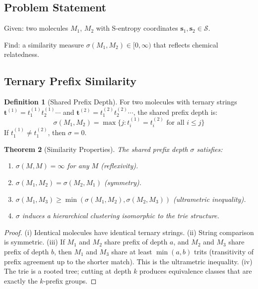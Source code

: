 \documentclass[11pt,twocolumn,a4paper]{article}
\newtheorem{theorem}{Theorem}[section]
\theoremstyle{definition}
\newtheorem{definition}[theorem]{Definition}
\theoremstyle{remark}
\newcommand{\Sspace}{\mathcal{S}}
\begin{document}
\subsection{Problem Statement}

Given: two molecules $M_1$, $M_2$ with S-entropy coordinates $\mathbf{s}_1, \mathbf{s}_2 \in \Sspace$.

Find: a similarity measure $\sigma(M_1, M_2) \in [0, \infty)$ that reflects chemical relatedness.

\subsection{Ternary Prefix Similarity}

\begin{definition}[Shared Prefix Depth]
\label{def:spd}
For two molecules with ternary strings $\mathbf{t}^{(1)} = t_1^{(1)} t_2^{(1)} \cdots$ and $\mathbf{t}^{(2)} = t_1^{(2)} t_2^{(2)} \cdots$, the shared prefix depth is:
\begin{equation}
\sigma(M_1, M_2) = \max\{j : t_i^{(1)} = t_i^{(2)} \text{ for all } i \leq j\}
\label{eq:spd}
\end{equation}
If $t_1^{(1)} \neq t_1^{(2)}$, then $\sigma = 0$.
\end{definition}

\begin{theorem}[Similarity Properties]
\label{thm:similarity_props}
The shared prefix depth $\sigma$ satisfies:
\begin{enumerate}[nosep]
\item[(i)] $\sigma(M, M) = \infty$ for any $M$ (reflexivity).
\item[(ii)] $\sigma(M_1, M_2) = \sigma(M_2, M_1)$ (symmetry).
\item[(iii)] $\sigma(M_1, M_3) \geq \min(\sigma(M_1, M_2), \sigma(M_2, M_3))$ (ultrametric inequality).
\item[(iv)] $\sigma$ induces a hierarchical clustering isomorphic to the trie structure.
\end{enumerate}
\end{theorem}

\begin{proof}
(i) Identical molecules have identical ternary strings. (ii) String comparison is symmetric. (iii) If $M_1$ and $M_2$ share prefix of depth $a$, and $M_2$ and $M_3$ share prefix of depth $b$, then $M_1$ and $M_3$ share at least $\min(a,b)$ trits (transitivity of prefix agreement up to the shorter match). This is the ultrametric inequality. (iv) The trie is a rooted tree; cutting at depth $k$ produces equivalence classes that are exactly the $k$-prefix groups.
\end{proof}
\end{document}
